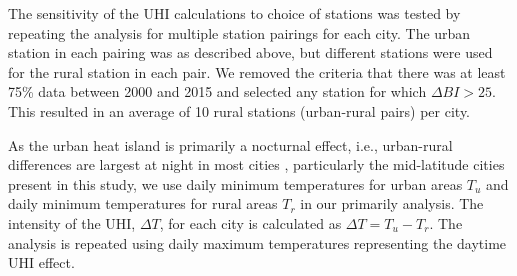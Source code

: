 \documentclass[12pt]{iopart}
\begin{document}
The sensitivity of the UHI calculations to choice of stations was tested by repeating the analysis for multiple station pairings for each city.  The urban station in each pairing was as described above, but different stations were used for the rural station in each pair. We removed the criteria that there was at least 75\% data between 2000 and 2015 and selected any station for which $\Delta BI > 25$. This resulted in an average of 10 rural stations (urban-rural pairs) per city.

As the urban heat island is primarily a nocturnal effect, i.e., urban-rural differences are largest at night in most cities \cite{oke1982energetic}, particularly the mid-latitude cities present in this study, %
we use daily minimum temperatures for urban areas $T_u$ and daily minimum temperatures for rural areas $T_r$ in our primarily analysis. The intensity of the UHI, $\Delta T$, for each city is calculated as $\Delta T = T_u - T_r$.  The analysis is repeated using daily maximum temperatures representing the daytime UHI effect.
\end{document}
